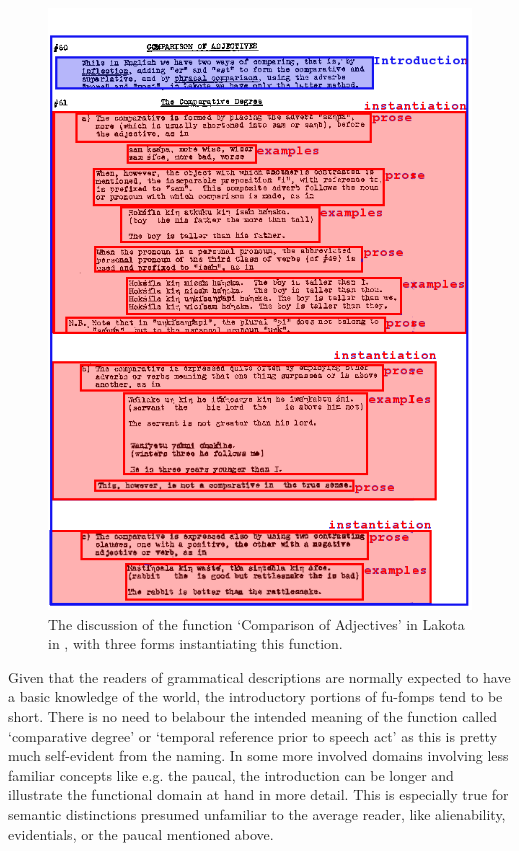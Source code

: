 \documentclass[a4paper,12pt]{article}
\begin{document}
\begin{figure}
\includegraphics[height=\textheight]{lakota}
\caption{The discussion of the function `Comparison of Adjectives' in Lakota in \citet{Buechel1939}, with three forms instantiating this function.}
\label{fig:lakota}
\end{figure}

Given that the readers of grammatical descriptions are normally expected to have a basic knowledge of the world, the introductory portions of fu-fomps tend to be short. There is no need to belabour the intended meaning of the function called `comparative degree' or `temporal reference prior to speech act' as this is pretty much self-evident from the naming. In some more involved domains involving less familiar concepts like e.g. the paucal, the introduction can be longer and illustrate the functional domain at hand in more detail. This is especially true for semantic distinctions presumed unfamiliar to the average reader, like alienability, evidentials, or the paucal mentioned above.
\end{document}
